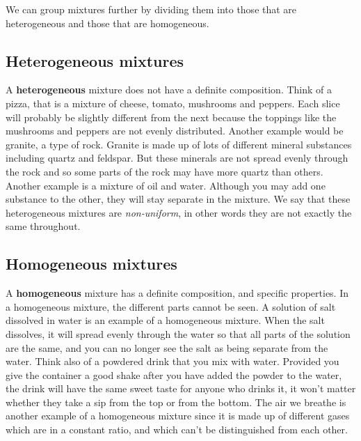We can group mixtures further by dividing them into those that are heterogeneous and those that are homogeneous.

\subsection{Heterogeneous mixtures}

A \textbf{heterogeneous} mixture does not have a definite composition. Think of a pizza, that is a mixture of cheese, tomato, mushrooms and peppers. Each slice will probably be slightly different from the next because the toppings like the mushrooms and peppers are not evenly distributed. Another example would be granite, a type of rock. Granite is made up of lots of different mineral substances including quartz and feldspar. But these minerals are not spread evenly through the rock and so some parts of the rock may have more quartz than others. Another example is a mixture of oil and water. Although you may add one substance to the other, they will stay separate in the mixture. We say that these heterogeneous mixtures are \textit{non-uniform}, in other words they are not exactly the same throughout.  


\subsection{Homogeneous mixtures}

A \textbf{homogeneous} mixture has a definite composition, and specific properties. In a homogeneous mixture, the different parts cannot be seen. A solution of salt dissolved in water is an example of a homogeneous mixture. When the salt dissolves, it will spread evenly through the water so that all parts of the solution are the same, and you can no longer see the salt as being separate from the water. Think also of a powdered drink that you mix with water. Provided you give the container a good shake after you have added the powder to the water, the drink will have the same sweet taste for anyone who drinks it, it won't matter whether they take a sip from the top or from the bottom. The air we breathe is another example of a homogeneous mixture since it is made up of different gases which are in a constant ratio, and which can't be distinguished from each other.


